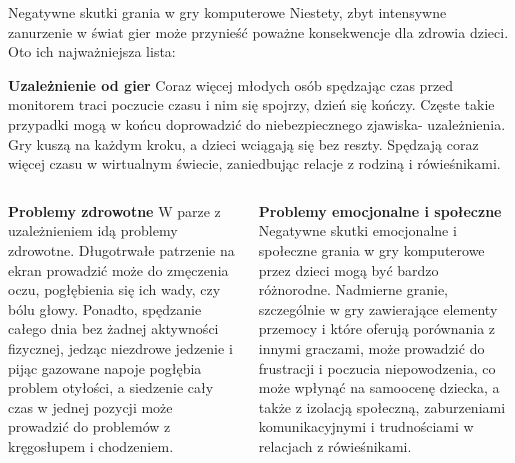 \documentclass{beamer}
\begin{document}
\begin{frame}{Negatywne skutki grania w gry komputerowe} %
Niestety, zbyt intensywne zanurzenie w świat gier może przynieść poważne konsekwencje dla zdrowia dzieci. Oto ich najważniejsza lista:
\newline

        \normalsize \textbf {Uzależnienie od gier}
\newline
Coraz więcej młodych osób spędzając czas przed monitorem traci poczucie czasu i nim się spojrzy, dzień się kończy. Częste takie przypadki mogą w końcu doprowadzić do niebezpiecznego zjawiska- uzależnienia. Gry kuszą na każdym kroku, a dzieci wciągają się bez reszty. Spędzają coraz więcej czasu w wirtualnym świecie, zaniedbując relacje z rodziną i rówieśnikami. 

\end{frame}

\begin{frame} %
\begin{columns}
\begin{column}{0.5\textwidth}
	   \normalsize \textbf {Problemy zdrowotne}
\newline
W parze z uzależnieniem idą problemy zdrowotne. Długotrwałe patrzenie na ekran prowadzić może do zmęczenia oczu, pogłębienia się ich wady, czy bólu głowy. Ponadto, spędzanie całego dnia bez żadnej aktywności fizycznej, jedząc niezdrowe jedzenie i pijąc gazowane napoje pogłębia problem otyłości, a siedzenie cały czas w jednej pozycji może prowadzić do problemów z kręgosłupem i chodzeniem.
\end{column}

\begin{column}{0.5\textwidth}
	   \normalsize \textbf {Problemy emocjonalne i społeczne}
\newline
 \small Negatywne skutki emocjonalne i społeczne grania w gry komputerowe przez dzieci mogą być bardzo różnorodne. Nadmierne granie, szczególnie w gry zawierające elementy przemocy i które oferują porównania z innymi graczami, może prowadzić do frustracji i poczucia niepowodzenia, co może wpłynąć na samoocenę dziecka, a także z izolacją społeczną, zaburzeniami komunikacyjnymi i trudnościami w relacjach z rówieśnikami. 

\end{column}
\end{columns}
\end{frame}
\end{document}
